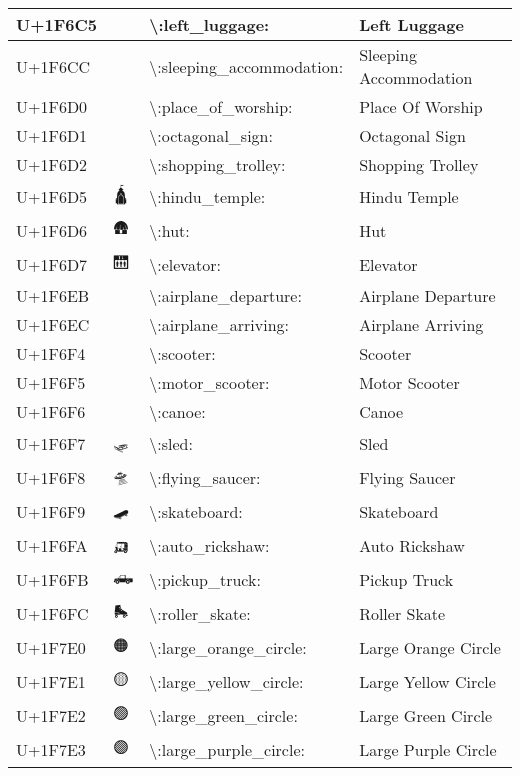 \begin{table}[h]
\begin{tabulary}{\linewidth}{|L|L|L|L|}
\hline
U+1F6C5 & 🛅 & {\textbackslash}:left\_luggage: & Left Luggage \\
\hline
U+1F6CC & 🛌 & {\textbackslash}:sleeping\_accommodation: & Sleeping Accommodation \\
\hline
U+1F6D0 & 🛐 & {\textbackslash}:place\_of\_worship: & Place Of Worship \\
\hline
U+1F6D1 & 🛑 & {\textbackslash}:octagonal\_sign: & Octagonal Sign \\
\hline
U+1F6D2 & 🛒 & {\textbackslash}:shopping\_trolley: & Shopping Trolley \\
\hline
U+1F6D5 & 🛕 & {\textbackslash}:hindu\_temple: & Hindu Temple \\
\hline
U+1F6D6 & 🛖 & {\textbackslash}:hut: & Hut \\
\hline
U+1F6D7 & 🛗 & {\textbackslash}:elevator: & Elevator \\
\hline
U+1F6EB & 🛫 & {\textbackslash}:airplane\_departure: & Airplane Departure \\
\hline
U+1F6EC & 🛬 & {\textbackslash}:airplane\_arriving: & Airplane Arriving \\
\hline
U+1F6F4 & 🛴 & {\textbackslash}:scooter: & Scooter \\
\hline
U+1F6F5 & 🛵 & {\textbackslash}:motor\_scooter: & Motor Scooter \\
\hline
U+1F6F6 & 🛶 & {\textbackslash}:canoe: & Canoe \\
\hline
U+1F6F7 & 🛷 & {\textbackslash}:sled: & Sled \\
\hline
U+1F6F8 & 🛸 & {\textbackslash}:flying\_saucer: & Flying Saucer \\
\hline
U+1F6F9 & 🛹 & {\textbackslash}:skateboard: & Skateboard \\
\hline
U+1F6FA & 🛺 & {\textbackslash}:auto\_rickshaw: & Auto Rickshaw \\
\hline
U+1F6FB & 🛻 & {\textbackslash}:pickup\_truck: & Pickup Truck \\
\hline
U+1F6FC & 🛼 & {\textbackslash}:roller\_skate: & Roller Skate \\
\hline
U+1F7E0 & 🟠 & {\textbackslash}:large\_orange\_circle: & Large Orange Circle \\
\hline
U+1F7E1 & 🟡 & {\textbackslash}:large\_yellow\_circle: & Large Yellow Circle \\
\hline
U+1F7E2 & 🟢 & {\textbackslash}:large\_green\_circle: & Large Green Circle \\
\hline
U+1F7E3 & 🟣 & {\textbackslash}:large\_purple\_circle: & Large Purple Circle \\

\end{tabulary}
\end{table}
